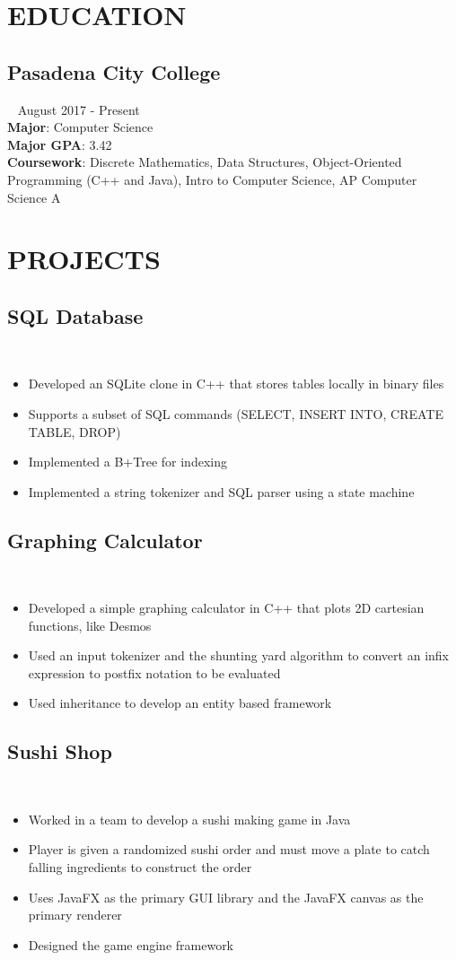\documentclass{article}
\newcommand{\resumesection}[3]{
    \subsection*{#1}
    \ 
    \footnotesize
    \textcolor{wordgrey}{#2}
    \normalsize
    \hfill
    \textcolor{wordgrey}{#3}
}
\begin{document}
\pagestyle{useheader}

\section*{\textcolor{wordblue}{EDUCATION}}
\resumesection{Pasadena City College}{}{August 2017 - Present}\\
\textbf{Major}: Computer Science\\
\textbf{Major GPA}: 3.42\\
\textbf{Coursework}: Discrete Mathematics, Data Structures, Object-Oriented Programming (C++ and Java), Intro to Computer Science, AP Computer Science A


\section*{\textcolor{wordblue}{PROJECTS}}
\resumesection{SQL Database}{}{}
\begin{itemize}
    \item Developed an SQLite clone in C++ that stores tables locally in binary files
    \item Supports a subset of SQL commands (SELECT, INSERT INTO, CREATE TABLE, DROP) 
    \item Implemented a B+Tree for indexing
    \item Implemented a string tokenizer and SQL parser using a state machine
\end{itemize}

\resumesection{Graphing Calculator}{}{}
\begin{itemize}
    \item Developed a simple graphing calculator in C++ that plots 2D cartesian functions, like Desmos
    \item Used an input tokenizer and the shunting yard algorithm to convert an infix expression to postfix notation to be evaluated
    \item Used inheritance to develop an entity based framework
\end{itemize}

\resumesection{Sushi Shop}{}{}
\begin{itemize}
    \item Worked in a team to develop a sushi making game in Java
    \item Player is given a randomized sushi order and must move a plate to catch falling ingredients to construct the order
    \item Uses JavaFX as the primary GUI library and the JavaFX canvas as the primary renderer 
    \item Designed the game engine framework
\end{itemize}
\end{document}
